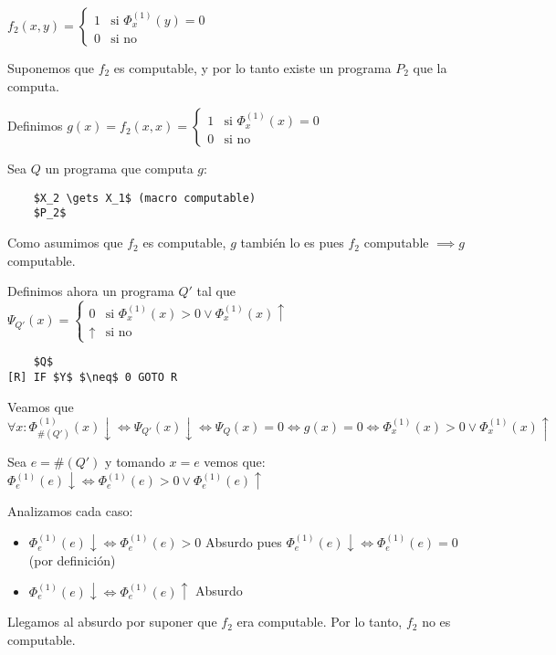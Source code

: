 $f_2(x, y) = \begin{cases}
    1 & \text{si } \Phi_x^{(1)}(y) = 0 \\
    0 & \text{si no}
\end{cases}$

Suponemos que $f_2$ es computable, y por lo tanto existe un programa $P_2$ que la computa.

Definimos $g(x) = f_2(x, x) = \begin{cases}
    1 & \text{si } \Phi_x^{(1)}(x) = 0 \\
    0 & \text{si no}
\end{cases}$

Sea $Q$ un programa que computa $g$:

\begin{lstlisting}
    $X_2 \gets X_1$ (macro computable)
    $P_2$
\end{lstlisting}

Como asumimos que $f_2$ es computable, $g$ también lo es pues $f_2$ computable $\implies g$ computable.

Definimos ahora un programa $Q'$ tal que $\Psi_{Q'}(x) = \begin{cases}
    0 & \text{si } \Phi_x^{(1)}(x) > 0 \lor \Phi_x^{(1)}(x) \uparrow \\
    \uparrow & \text{si no}
\end{cases}$

\begin{lstlisting}
    $Q$
[R] IF $Y$ $\neq$ 0 GOTO R
\end{lstlisting}

Veamos que $\forall x: \Phi_{\#(Q')}^{(1)}(x) \downarrow \iff \Psi_{Q'}(x) \downarrow \iff \Psi_Q(x) = 0 \iff g(x) = 0 \iff \Phi_x^{(1)}(x) > 0 \lor \Phi_x^{(1)}(x) \uparrow$

Sea $e = \#(Q')$ y tomando $x = e$ vemos que: $\Phi_e^{(1)}(e) \downarrow \iff \Phi_e^{(1)}(e) > 0 \lor \Phi_e^{(1)}(e) \uparrow$

Analizamos cada caso:

\begin{itemize}
    \item $\Phi_e^{(1)}(e) \downarrow \iff \Phi_e^{(1)}(e) > 0$ Absurdo pues $\Phi_e^{(1)}(e) \downarrow \iff \Phi_e^{(1)}(e) = 0$ (por definición)
    \item $\Phi_e^{(1)}(e) \downarrow \iff \Phi_e^{(1)}(e) \uparrow$ Absurdo
\end{itemize}

Llegamos al absurdo por suponer que $f_2$ era computable. Por lo tanto, $f_2$ no es computable.

